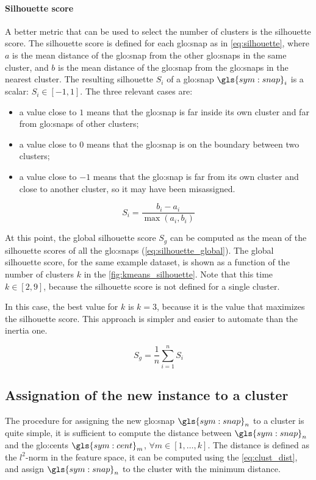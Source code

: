 \paragraph*{Silhouette score}
A better metric that can be used to select the number of clusters is the silhouette score.
The silhouette score is defined for each {\gls{glo:snap}} as in \autoref{eq:silhouette}, where $a$ is the mean distance of the {\gls{glo:snap}} from the other {\gls{glo:snap}}s in the same cluster, and $b$ is the mean distance of the {\gls{glo:snap}} from the {\gls{glo:snap}}s in the nearest cluster. The resulting silhouette $S_i$ of a {\gls{glo:snap}} $\gls{sym:snap}_i$ is a scalar: $S_i \in [-1,1]$.
The three relevant cases are:
\begin{itemize}
  \item a value close to $1$ means that the {\gls{glo:snap}} is far inside its own cluster and far from {\gls{glo:snap}}s of other clusters;
  \item a value close to $0$ means that the {\gls{glo:snap}} is on the boundary between two clusters;
  \item a value close to $-1$ means that the {\gls{glo:snap}} is far from its own cluster and close to another cluster, so it may have been misassigned.
\end{itemize}

\begin{equation}
  \label{eq:silhouette}
  S_i = \frac{b_i - a_i}{\max{(a_i,b_i)}}
\end{equation}

At this point, the global silhouette score $S_g$ can be computed as the mean of the silhouette scores of all the {\gls{glo:snap}}s (\autoref{eq:silhouette_global}). The global silhouette score, for the same example dataset, is shown as a function of the number of clusters $k$ in the \autoref{fig:kmeans_silhouette}. Note that this time $k \in [2,9]$, because the silhouette score is not defined for a single cluster.

In this case, the best value for $k$ is $k=3$, because it is the value that maximizes the silhouette score. This approach is simpler and easier to automate than the inertia one. 

\begin{equation}
  \label{eq:silhouette_global}
  S_g = \frac{1}{n}\sum_{i=1}^{n} S_i
\end{equation}

\subsection{Assignation of the new instance to a cluster}
The procedure for assigning the new {\gls{glo:snap}} $\gls{sym:snap}_n$ to a cluster is quite simple, it is sufficient to compute the distance between $\gls{sym:snap}_n$ and the {\gls{glo:cent}}s $\gls{sym:cent}_m$, $\forall m \in  [1, \dots , k]$. The distance is defined as the $l^2$-norm in the feature space, it can be computed using the \autoref{eq:clust_dist}, and assign $\gls{sym:snap}_n$ to the cluster with the minimum distance.

